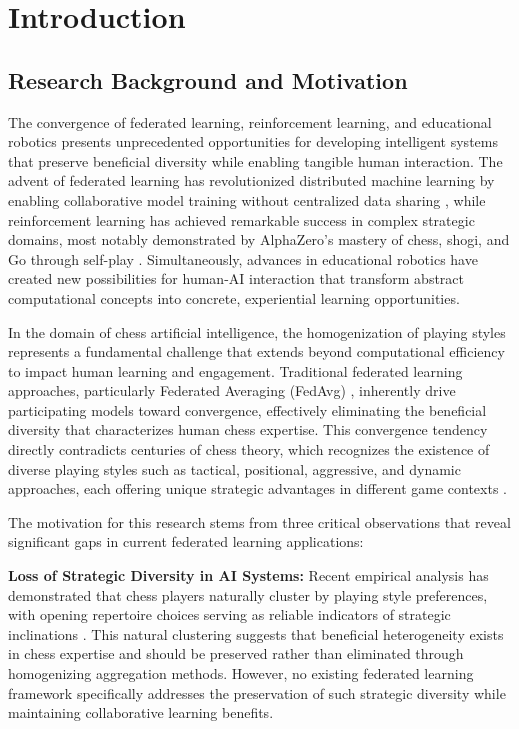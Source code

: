 \chapter{Introduction}
\label{ch:introduction}

\section{Research Background and Motivation}
\label{sec:background}

The convergence of federated learning, reinforcement learning, and educational robotics presents unprecedented opportunities for developing intelligent systems that preserve beneficial diversity while enabling tangible human interaction. The advent of federated learning has revolutionized distributed machine learning by enabling collaborative model training without centralized data sharing \cite{mcmahan2017fedavg}, while reinforcement learning has achieved remarkable success in complex strategic domains, most notably demonstrated by AlphaZero's mastery of chess, shogi, and Go through self-play \cite{silver2017mastering}. Simultaneously, advances in educational robotics have created new possibilities for human-AI interaction that transform abstract computational concepts into concrete, experiential learning opportunities.

In the domain of chess artificial intelligence, the homogenization of playing styles represents a fundamental challenge that extends beyond computational efficiency to impact human learning and engagement. Traditional federated learning approaches, particularly Federated Averaging (FedAvg) \cite{mcmahan2017fedavg}, inherently drive participating models toward convergence, effectively eliminating the beneficial diversity that characterizes human chess expertise. This convergence tendency directly contradicts centuries of chess theory, which recognizes the existence of diverse playing styles such as tactical, positional, aggressive, and dynamic approaches, each offering unique strategic advantages in different game contexts \cite{matanovic1974encyclopedia}.

The motivation for this research stems from three critical observations that reveal significant gaps in current federated learning applications:

\textbf{Loss of Strategic Diversity in AI Systems:} Recent empirical analysis has demonstrated that chess players naturally cluster by playing style preferences, with opening repertoire choices serving as reliable indicators of strategic inclinations \cite{demarzo2022quantifying}. This natural clustering suggests that beneficial heterogeneity exists in chess expertise and should be preserved rather than eliminated through homogenizing aggregation methods. However, no existing federated learning framework specifically addresses the preservation of such strategic diversity while maintaining collaborative learning benefits.


